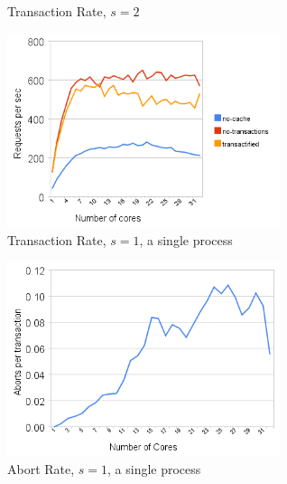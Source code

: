\documentclass[preprint,natbib,11pt]{sigplanconf}
\begin{document}
\begin{figure}
 \begin{center}
 \end{center}
 \caption{Transaction Rate, $s = 2$}
 \label{fig:transaction-rate-2}
\end{figure}
\begin{figure}
 \begin{center}
  \includegraphics[width=8cm]{transaction-rate-single-process.png}
 \end{center}
 \caption{Transaction Rate, $s = 1$, a single process}
 \label{fig:one-process-transaction-rate}
\end{figure}
\begin{figure}
 \begin{center}
  \includegraphics[width=8cm]{abort-rate.png}
 \end{center}
 \caption{Abort Rate, $s = 1$, a single process}
 \label{fig:abort-rate}
\end{figure}
\end{document}
